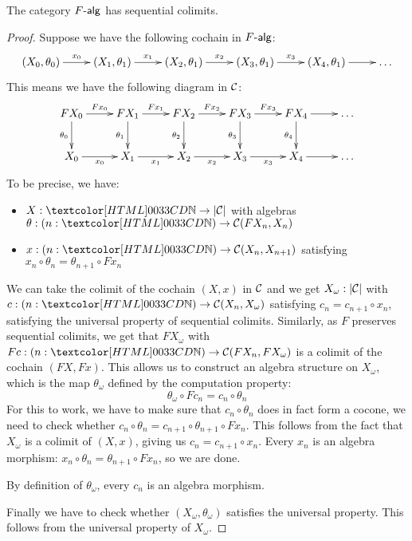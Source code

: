 \begin{proposition}
  The category $\algcat{F}$ has sequential colimits.
\end{proposition}

\begin{proof}
  Suppose we have the following cochain in $\algcat{F}$:
  $$
  \xymatrix{
    (X_0,\theta_0) \ar[r]^{x_0}
    &(X_1,\theta_1) \ar[r]^{x_1} 
    &(X_2,\theta_1) \ar[r]^{x_2} 
    &(X_3,\theta_1) \ar[r]^{x_3}
    &(X_4,\theta_1) \ar[r]
    &\hdots
  }
  $$
  This means we have the following diagram in $\mathcal{C}$:
  $$
  \xymatrix{
    F X_0 \ar[r]^{F x_0} \ar[d]_{\theta_0}
    &F X_1 \ar[r]^{F x_1} \ar[d]_{\theta_1}
    &F X_2 \ar[r]^{F x_2} \ar[d]_{\theta_2}
    &F X_3 \ar[r]^{F x_3} \ar[d]_{\theta_3}
    &F X_4 \ar[r] \ar[d]_{\theta_4} 
    &\hdots
    \\
    X_0 \ar[r]_{x_0}
    &X_1 \ar[r]_{x_1}
    &X_2 \ar[r]_{x_2}
    &X_3 \ar[r]_{x_3}
    &X_4 \ar[r]
    &\hdots
  }
  $$
  To be precise, we have:
  \begin{itemize}
  \item $X : \natty \to | \Cc |$ with algebras $\theta : (n : \natty) \to \Cc(F X_n, X_n)$
  \item $x : (n : \natty) \to \Cc(X_n,X_{n+1})$ satisfying $x_n \circ \theta_n = \theta_{n+1} \circ Fx_n$
  \end{itemize}

  We can take the colimit of the cochain $(X,x)$ in $\mathcal{C}$ and we get
  $X_{\omega} : | \mathcal{C} |$ with
  $c : (n : \natty) \to \Cc(X_n,X_{\omega})$ satisfying
  $c_n = c_{n+1} \circ x_n$, satisfying the universal property of
  sequential colimits. Similarly, as $F$ preserves sequential
  colimits, we get that $FX_{\omega}$ with
  $Fc : (n : \natty) \to \Cc(FX_n,FX_{\omega})$ is a colimit of the
  cochain $(FX,Fx)$. This allows us to construct an algebra structure
  on $X_{\omega}$, which is the map $\theta_{\omega}$ defined by the
  computation property:
  $$
  \theta_{\omega} \circ Fc_n = c_n \circ \theta_n
  $$
  For this to work, we have to make sure that $c_n \circ \theta_n$
  does in fact form a cocone, \ie we need to check whether
  $c_n \circ \theta_n = c_{n+1} \circ \theta_{n+1} \circ Fx_n$. This
  follows from the fact that $X_{\omega}$ is a colimit of $(X,x)$,
  giving us $c_n = c_{n+1} \circ x_n$. Every $x_n$ is an algebra
  morphism: $x_n \circ \theta_n = \theta_{n+1} \circ Fx_n$, so we are
  done.

  By definition of $\theta_{\omega}$, every $c_n$ is an algebra
  morphism.

  Finally we have to check whether $(X_{\omega},\theta_{\omega})$
  satisfies the universal property. This follows from the universal
  property of $X_{\omega}$.
\end{proof}

